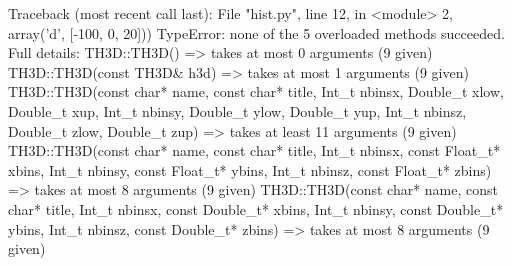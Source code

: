 \begin{footnotesize}
\begin{pyglist}[language=text,texcl=true,abovecaptionskip=0,style=bw]
Traceback (most recent call last):
  File "hist.py", line 12, in <module>
    2, array('d', [-100, 0, 20]))
TypeError: none of the 5 overloaded methods succeeded. Full details:
  TH3D::TH3D() =>
    takes at most 0 arguments (9 given)
  TH3D::TH3D(const TH3D& h3d) =>
    takes at most 1 arguments (9 given)
  TH3D::TH3D(const char* name, const char* title, Int_t nbinsx, Double_t xlow, Double_t xup, Int_t nbinsy, Double_t ylow, Double_t yup, Int_t nbinsz, Double_t zlow, Double_t zup) =>
    takes at least 11 arguments (9 given)
  TH3D::TH3D(const char* name, const char* title, Int_t nbinsx, const Float_t* xbins, Int_t nbinsy, const Float_t* ybins, Int_t nbinsz, const Float_t* zbins) =>
    takes at most 8 arguments (9 given)
  TH3D::TH3D(const char* name, const char* title, Int_t nbinsx, const Double_t* xbins, Int_t nbinsy, const Double_t* ybins, Int_t nbinsz, const Double_t* zbins) =>
    takes at most 8 arguments (9 given)
\end{pyglist}
\end{footnotesize}
